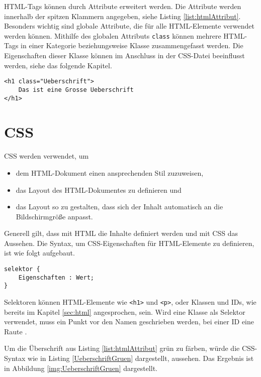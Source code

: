 HTML-Tags können durch Attribute erweitert werden. Die Attribute werden innerhalb der spitzen Klammern angegeben, siehe Listing \ref{list:htmlAttribut}. Besonders wichtig sind globale Attribute, die für alle HTML-Elemente verwendet werden können. Mithilfe des globalen Attributs \texttt{class} können mehrere HTML-Tags in einer Kategorie beziehungsweise Klasse zusammengefasst werden. Die Eigenschaften dieser Klasse können im Anschluss in der CSS-Datei beeinflusst werden, siehe das folgende Kapitel.

\begin{lstlisting}[caption=HTML Attribute, label=list:htmlAttribut]   
<h1 class="Ueberschrift"> 
    Das ist eine Grosse Ueberschrift 
</h1>
\end{lstlisting}


\section{CSS} \label{sec:css}

\ac{CSS} werden verwendet, um 
\begin{itemize}
    \item dem HTML-Dokument einen ansprechenden Stil zuzuweisen,
    \item das Layout des HTML-Dokumentes zu definieren und
    \item das Layout so zu gestalten, dass sich der Inhalt automatisch an die Bildschirmgröße anpasst. 
\end{itemize}

Generell gilt, dass mit HTML die Inhalte definiert werden und mit CSS das Aussehen. 
Die Syntax, um CSS-Eigenschaften für HTML-Elemente zu definieren, ist wie folgt aufgebaut. 

\begin{lstlisting}[caption= Die generelle Syntax für CSS-Eigenschaften, label=syntaxCSS]
selektor {
    Eigenschaften : Wert;
}
\end{lstlisting}

Selektoren können HTML-Elemente wie \texttt{<h1>} und \texttt{<p>}, oder Klassen und IDs, wie bereits im Kapitel \ref{sec:html} angesprochen, sein. Wird eine Klasse als Selektor verwendet, muss ein Punkt vor den Namen geschrieben werden, bei einer ID eine Raute \cite{W3CSS2021}.

Um die Überschrift aus Listing \ref{list:htmlAttribut} grün zu färben, würde die CSS-Syntax wie in Listing \ref{UeberschriftGruen} dargestellt, aussehen. Das Ergebnis ist in Abbildung \ref{img:UeberschriftGruen} dargestellt.  

